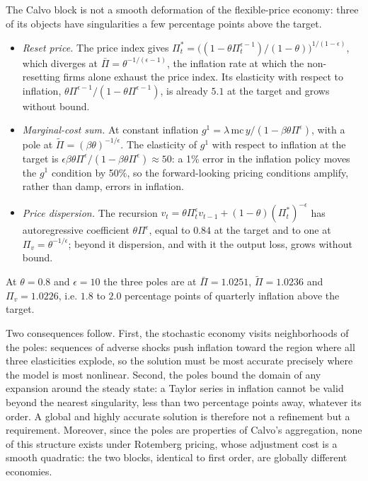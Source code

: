 \documentclass[11pt]{article}
\begin{document}
The Calvo block is not a smooth deformation of the flexible-price economy: three of its objects have singularities a few percentage points above the target.
\begin{itemize}[leftmargin=1.5em]
\item \emph{Reset price.} The price index gives $\Pi^*_t = \big( (1 - \theta \Pi_t^{\epsilon-1})/(1-\theta) \big)^{1/(1-\epsilon)}$, which diverges at $\bar\Pi = \theta^{-1/(\epsilon-1)}$, the inflation rate at which the non-resetting firms alone exhaust the price index. Its elasticity with respect to inflation, $\theta \Pi^{\epsilon-1}/(1 - \theta \Pi^{\epsilon-1})$, is already $5.1$ at the target and grows without bound.
\item \emph{Marginal-cost sum.} At constant inflation $g^1 = \lambda\, \mathrm{mc}\, y / (1 - \beta\theta \Pi^{\epsilon})$, with a pole at $\tilde\Pi = (\beta\theta)^{-1/\epsilon}$. The elasticity of $g^1$ with respect to inflation at the target is $\epsilon \beta\theta \Pi^{\epsilon} / (1 - \beta\theta\Pi^{\epsilon}) \approx 50$: a 1\% error in the inflation policy moves the $g^1$ condition by 50\%, so the forward-looking pricing conditions amplify, rather than damp, errors in inflation.
\item \emph{Price dispersion.} The recursion $v_t = \theta \Pi_t^{\epsilon} v_{t-1} + (1-\theta)(\Pi^*_t)^{-\epsilon}$ has autoregressive coefficient $\theta \Pi^{\epsilon}$, equal to $0.84$ at the target and to one at $\Pi_v = \theta^{-1/\epsilon}$; beyond it dispersion, and with it the output loss, grows without bound.
\end{itemize}
At $\theta = 0.8$ and $\epsilon = 10$ the three poles are at $\bar\Pi = 1.0251$, $\tilde\Pi = 1.0236$ and $\Pi_v = 1.0226$, i.e. $1.8$ to $2.0$ percentage points of quarterly inflation above the target.

Two consequences follow. First, the stochastic economy visits
neighborhoods of the poles: sequences of adverse shocks push inflation toward
the region where all three elasticities explode, so the solution must be most
accurate precisely where the model is most nonlinear. Second, the poles bound
the domain of any expansion around the steady state: a Taylor series in
inflation cannot be valid beyond the nearest singularity, less than two
percentage points away, whatever its order. A global and highly accurate
solution is therefore not a refinement but a requirement. Moreover, since the
poles are properties of Calvo's aggregation, none of this structure exists
under Rotemberg pricing, whose adjustment cost is a smooth quadratic: the two
blocks, identical to first order, are globally different economies.
\end{document}
